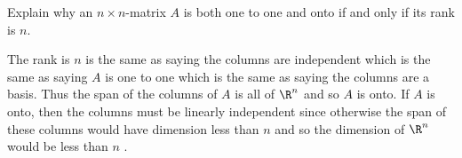 \begin{enumialphparenastyle}
\begin{ex} Explain why an $n\times n$-matrix $A$ is both one to one and onto if
and only if its rank is $n$. \vspace{1mm}
\begin{sol}
The rank is $n$ is the same as saying the
columns are independent which is the same as saying $A$ is one to one which
is the same as saying the columns are a basis. Thus the span of the columns
of $A$ is all of $\R^{n}$ and so $A$ is onto. If $A$ is onto, then
the columns must be linearly independent since otherwise the span of these
columns would have dimension less than $n$ and so the dimension of $\R^{n}$ would be less than $n$ .
\end{sol}
\end{ex}

\end{enumialphparenastyle}
